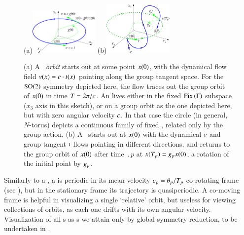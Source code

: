 %
\begin{figure}[ht]
(a)\includegraphics[width=0.3\textwidth]{../Fig/reqv.eps}
(b)\includegraphics[width=0.3\textwidth]{../Fig/rpo.eps}
\caption{
(a) A {\em \reqv\ orbit} starts out at some point $x(0)$,
with the dynamical flow field $v(x) = c \cdot
t(x)$ pointing along the group tangent space. For
the $\textrm{SO}(2)$ symmetry depicted here, the flow traces out the
group orbit of $x(0)$ in time ${T_{}}=2\pi/c$.
An
{\em \eqv} lives either in the fixed $\mathrm{Fix}\left(\Gamma\right)$ subspace
($x_3$ axis in this sketch), or on a group orbit as the one
depicted here, but with zero angular velocity $c$. In
that case the circle (in general, $N$-torus) depicts a
continuous family of fixed \eqva, related only by the group
action.
(b) A \rpo\ starts out at $x(0)$ with the dynamical $v$ and
group tangent $t$ flows pointing in different
directions, and returns to the group orbit of $x(0)$ after
time $\period{p}$ at $x({T_{p}})=g_p x (0)$, a
rotation of the initial point by $g_p$.
}
\label{f:rpo}
\end{figure}

Similarly to a \reqv, a \emph{\rpo} is periodic in its
mean velocity $c_p={\bf \theta}_p/{T_{p}}$ co-rotating
frame (see ), but in the
stationary frame its trajectory is quasiperiodic.
A co-moving
frame is helpful in visualizing a single `relative' orbit,
but useless for viewing collections of orbits, as each one
drifts with its own angular velocity. Visualization of all
\rpo s as \po s we attain only by global symmetry reduction,
to be undertaken in .


